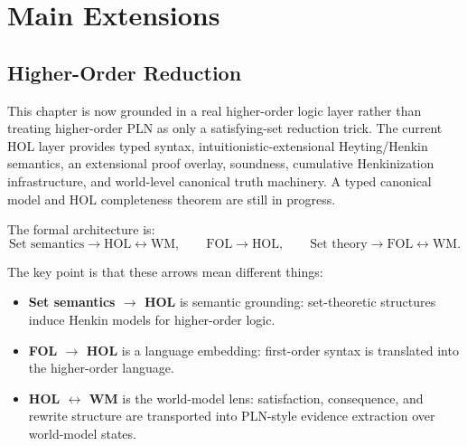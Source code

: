\documentclass[11pt,openany]{report}
\begin{document}
\part{Main Extensions}
\label{part:extensions}

\chapter{Higher-Order Reduction}
\label{ch:higher-order}

This chapter is now grounded in a real higher-order logic layer rather than
treating higher-order PLN as only a satisfying-set reduction trick.
The current HOL layer provides typed syntax, intuitionistic-extensional
Heyting/Henkin semantics, an extensional proof overlay, soundness, cumulative
Henkinization infrastructure, and world-level canonical truth machinery.
A typed canonical model and HOL completeness theorem are still in progress.

The formal architecture is:
\[
  \text{Set semantics} \longrightarrow \text{HOL} \longleftrightarrow \text{WM},
  \qquad
  \text{FOL} \longrightarrow \text{HOL},
  \qquad
  \text{Set theory} \longrightarrow \text{FOL} \longleftrightarrow \text{WM}.
\]

The key point is that these arrows mean different things:
\begin{itemize}
\item \textbf{Set semantics $\to$ HOL} is semantic grounding: set-theoretic
  structures induce Henkin models for higher-order logic.
\item \textbf{FOL $\to$ HOL} is a language embedding: first-order syntax is
  translated into the higher-order language.
\item \textbf{HOL $\leftrightarrow$ WM} is the world-model lens: satisfaction,
  consequence, and rewrite structure are transported into PLN-style evidence
  extraction over world-model states.
\end{itemize}
\end{document}
